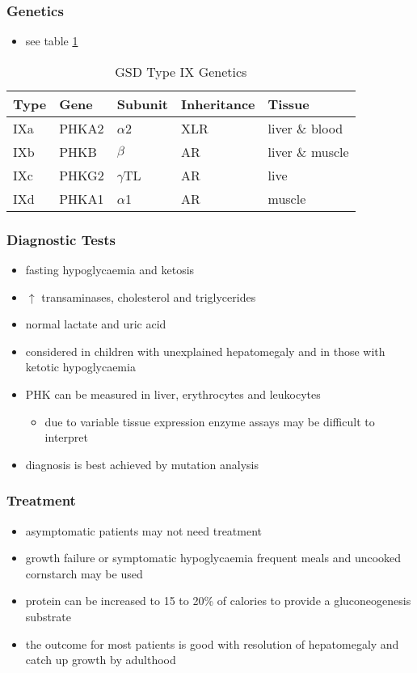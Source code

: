 \documentclass[12pt]{scrartcl}
\begin{document}
\subsubsection{Genetics}
\label{sec:org0721018}
\begin{itemize}
\item see table \ref{tab:orge130f74}
\end{itemize}
\begin{table}[htbp]
\caption{\label{tab:orge130f74}GSD Type IX Genetics}
\centering
\begin{tabular}{lllll}
Type & Gene & Subunit & Inheritance & Tissue\\
\hline
IXa & PHKA2 & \(\alpha\)2 & XLR & liver \& blood\\
IXb & PHKB & \(\beta\) & AR & liver \& muscle\\
IXc & PHKG2 & \(\gamma\)TL & AR & live\\
IXd & PHKA1 & \(\alpha\)1 & AR & muscle\\
\end{tabular}
\end{table}

\subsubsection{Diagnostic Tests}
\label{sec:org8cc8f56}
\begin{itemize}
\item fasting hypoglycaemia and ketosis
\item \(\uparrow\) transaminases, cholesterol and triglycerides
\item normal lactate and uric acid
\item considered in children with unexplained hepatomegaly and in those
with ketotic hypoglycaemia
\item PHK can be measured in liver, erythrocytes and leukocytes
\begin{itemize}
\item due to variable tissue expression enzyme assays may be difficult
to interpret
\end{itemize}
\item diagnosis is best achieved by mutation analysis
\end{itemize}
\subsubsection{Treatment}
\label{sec:org9fb2435}
\begin{itemize}
\item asymptomatic patients may not need treatment
\item growth failure or symptomatic hypoglycaemia frequent meals and
uncooked cornstarch may be used
\item protein can be increased to 15 to 20\% of calories to provide a
gluconeogenesis substrate
\item the outcome for most patients is good with resolution of
hepatomegaly and catch up growth by adulthood
\end{itemize}
\end{document}
